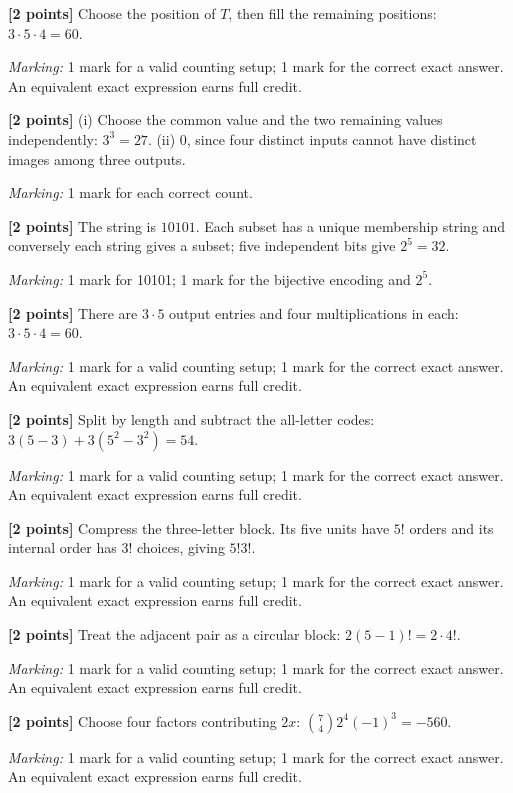 \documentclass[12pt,letterpaper]{article}
\begin{document}
\begin{description}[font=\normalfont,leftmargin=1.2em,labelsep=0.4em]
\item[(a)] \textbf{[2 points]} Choose the position of $T$, then fill the remaining positions: $3\cdot5\cdot4=60$.
\par\textit{Marking:} 1 mark for a valid counting setup; 1 mark for the correct exact answer. An equivalent exact expression earns full credit.
\item[(b)] \textbf{[2 points]} (i) Choose the common value and the two remaining values independently: $3^3=27$. (ii) $0$, since four distinct inputs cannot have distinct images among three outputs.
\par\textit{Marking:} 1 mark for each correct count.
\item[(c)] \textbf{[2 points]} The string is $10101$. Each subset has a unique membership string and conversely each string gives a subset; five independent bits give $2^5=32$.
\par\textit{Marking:} 1 mark for 10101; 1 mark for the bijective encoding and $2^5$.
\item[(d)] \textbf{[2 points]} There are $3\cdot5$ output entries and four multiplications in each: $3\cdot5\cdot4=60$.
\par\textit{Marking:} 1 mark for a valid counting setup; 1 mark for the correct exact answer. An equivalent exact expression earns full credit.
\item[(e)] \textbf{[2 points]} Split by length and subtract the all-letter codes: $3(5-3)+3(5^2-3^2)=54$.
\par\textit{Marking:} 1 mark for a valid counting setup; 1 mark for the correct exact answer. An equivalent exact expression earns full credit.
\item[(f)] \textbf{[2 points]} Compress the three-letter block. Its five units have $5!$ orders and its internal order has $3!$ choices, giving $5!3!$.
\par\textit{Marking:} 1 mark for a valid counting setup; 1 mark for the correct exact answer. An equivalent exact expression earns full credit.
\item[(g)] \textbf{[2 points]} Treat the adjacent pair as a circular block: $2(5-1)!=2\cdot4!$.
\par\textit{Marking:} 1 mark for a valid counting setup; 1 mark for the correct exact answer. An equivalent exact expression earns full credit.
\item[(h)] \textbf{[2 points]} Choose four factors contributing $2x$: $\binom74 2^4(-1)^3=-560$.
\par\textit{Marking:} 1 mark for a valid counting setup; 1 mark for the correct exact answer. An equivalent exact expression earns full credit.
\end{description}
\end{document}
